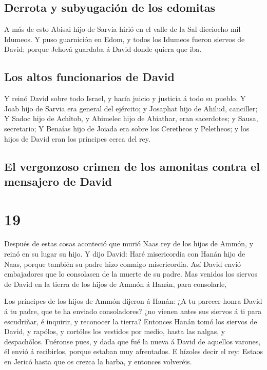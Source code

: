\hypertarget{derrota-y-subyugaciuxf3n-de-los-edomitas}{%
\subsection{Derrota y subyugación de los
edomitas}\label{derrota-y-subyugaciuxf3n-de-los-edomitas}}

 A más de esto Abisai hijo de Sarvia hirió en el valle de
la Sal dieciocho mil Idumeos.  Y puso guarnición en Edom,
y todos los Idumeos fueron siervos de David: porque Jehová guardaba á
David donde quiera que iba.

\hypertarget{los-altos-funcionarios-de-david}{%
\subsection{Los altos funcionarios de
David}\label{los-altos-funcionarios-de-david}}

 Y reinó David sobre todo Israel, y hacía juicio y
justicia á todo su pueblo.  Y Joab hijo de Sarvia era
general del ejército; y Josaphat hijo de Ahilud, canciller;
 Y Sadoc hijo de Achîtob, y Abimelec hijo de Abiathar,
eran sacerdotes; y Sausa, secretario;  Y Benaías hijo de
Joiada era sobre los Ceretheos y Peletheos; y los hijos de David eran
los príncipes cerca del rey.

\hypertarget{el-vergonzoso-crimen-de-los-amonitas-contra-el-mensajero-de-david}{%
\subsection{El vergonzoso crimen de los amonitas contra el mensajero de
David}\label{el-vergonzoso-crimen-de-los-amonitas-contra-el-mensajero-de-david}}

\hypertarget{section-18}{%
\section{19}\label{section-18}}

 Después de estas cosas aconteció que murió Naas rey de
los hijos de Ammón, y reinó en su lugar su hijo.  Y dijo
David: Haré misericordia con Hanán hijo de Naas, porque también su padre
hizo conmigo misericordia. Así David envió embajadores que lo consolasen
de la muerte de su padre. Mas venidos los siervos de David en la tierra
de los hijos de Ammón á Hanán, para consolarle,

 Los príncipes de los hijos de Ammón dijeron á Hanán: ¿A
tu parecer honra David á tu padre, que te ha enviado consoladores? ¿no
vienen antes sus siervos á ti para escudriñar, é inquirir, y reconocer
la tierra?  Entonces Hanán tomó los siervos de David, y
rapólos, y cortóles los vestidos por medio, hasta las nalgas, y
despachólos.  Fuéronse pues, y dada que fué la nueva á
David de aquellos varones, él envió á recibirlos, porque estaban muy
afrentados. E hízoles decir el rey: Estaos en Jericó hasta que os crezca
la barba, y entonces volveréis.

